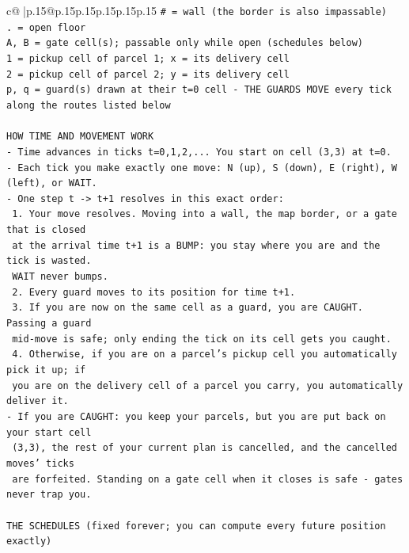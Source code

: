 \documentclass{article}
\begin{document}
{\begin{supertabular}{c@{$\;$}|p{.15\linewidth}@{}p{.15\linewidth}p{.15\linewidth}p{.15\linewidth}p{.15\linewidth}p{.15\linewidth}}
{{{\texttt{\# = wall (the border is also impassable)} \\
\texttt{. = open floor} \\
\texttt{A, B = gate cell(s); passable only while open (schedules below)} \\
\texttt{1 = pickup cell of parcel 1; x = its delivery cell} \\
\texttt{2 = pickup cell of parcel 2; y = its delivery cell} \\
\texttt{p, q = guard(s) drawn at their t=0 cell {-} THE GUARDS MOVE every tick along the routes listed below} \\
\\ 
\texttt{HOW TIME AND MOVEMENT WORK} \\
\texttt{{-} Time advances in ticks t=0,1,2,... You start on cell (3,3) at t=0.} \\
\texttt{{-} Each tick you make exactly one move: N (up), S (down), E (right), W (left), or WAIT.} \\
\texttt{{-} One step t {-}> t+1 resolves in this exact order:} \\
\texttt{  1. Your move resolves. Moving into a wall, the map border, or a gate that is closed} \\
\texttt{     at the arrival time t+1 is a BUMP: you stay where you are and the tick is wasted.} \\
\texttt{     WAIT never bumps.} \\
\texttt{  2. Every guard moves to its position for time t+1.} \\
\texttt{  3. If you are now on the same cell as a guard, you are CAUGHT. Passing a guard} \\
\texttt{     mid{-}move is safe; only ending the tick on its cell gets you caught.} \\
\texttt{  4. Otherwise, if you are on a parcel's pickup cell you automatically pick it up; if} \\
\texttt{     you are on the delivery cell of a parcel you carry, you automatically deliver it.} \\
\texttt{{-} If you are CAUGHT: you keep your parcels, but you are put back on your start cell} \\
\texttt{  (3,3), the rest of your current plan is cancelled, and the cancelled moves' ticks} \\
\texttt{  are forfeited. Standing on a gate cell when it closes is safe {-} gates never trap you.} \\
\\ 
\texttt{THE SCHEDULES (fixed forever; you can compute every future position exactly)} \\
}}}
\end{supertabular}}
\end{document}
